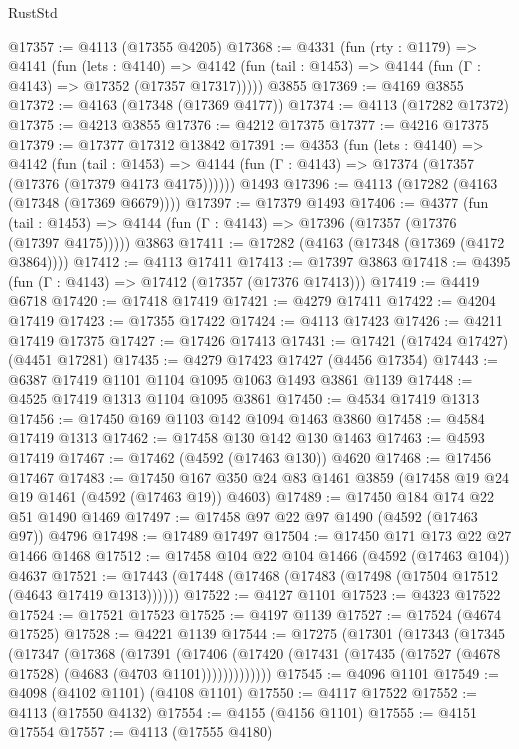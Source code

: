 \begin{lexlean}{RustStd}
\begin{coremodule}
@17357 := @4113 (@17355 @4205)
@17368 := @4331
    (fun (rty : @1179) =>
    @4141
      (fun (lets : @4140) =>
      @4142 (fun (tail : @1453) => @4144 (fun (Γ : @4143) => @17352 (@17357 @17317)))))
    @3855
@17369 := @4169 @3855
@17372 := @4163 (@17348 (@17369 @4177))
@17374 := @4113 (@17282 @17372)
@17375 := @4213 @3855
@17376 := @4212 @17375
@17377 := @4216 @17375
@17379 := @17377 @17312 @13842
@17391 := @4353
    (fun (lets : @4140) =>
    @4142
      (fun (tail : @1453) =>
      @4144 (fun (Γ : @4143) => @17374 (@17357 (@17376 (@17379 @4173 @4175))))))
    @1493
@17396 := @4113 (@17282 (@4163 (@17348 (@17369 @6679))))
@17397 := @17379 @1493
@17406 := @4377
    (fun (tail : @1453) => @4144 (fun (Γ : @4143) => @17396 (@17357 (@17376 (@17397 @4175)))))
    @3863
@17411 := @17282 (@4163 (@17348 (@17369 (@4172 @3864))))
@17412 := @4113 @17411
@17413 := @17397 @3863
@17418 := @4395 (fun (Γ : @4143) => @17412 (@17357 (@17376 @17413)))
@17419 := @4419 @6718
@17420 := @17418 @17419
@17421 := @4279 @17411
@17422 := @4204 @17419
@17423 := @17355 @17422
@17424 := @4113 @17423
@17426 := @4211 @17419 @17375
@17427 := @17426 @17413
@17431 := @17421 (@17424 @17427) (@4451 @17281)
@17435 := @4279 @17423 @17427 (@4456 @17354)
@17443 := @6387 @17419 @1101 @1104 @1095 @1063 @1493 @3861 @1139
@17448 := @4525 @17419 @1313 @1104 @1095 @3861
@17450 := @4534 @17419 @1313
@17456 := @17450 @169 @1103 @142 @1094 @1463 @3860
@17458 := @4584 @17419 @1313
@17462 := @17458 @130 @142 @130 @1463
@17463 := @4593 @17419
@17467 := @17462 (@4592 (@17463 @130)) @4620
@17468 := @17456 @17467
@17483 := @17450 @167 @350 @24 @83 @1461 @3859 (@17458 @19 @24 @19 @1461 (@4592 (@17463 @19)) @4603)
@17489 := @17450 @184 @174 @22 @51 @1490 @1469
@17497 := @17458 @97 @22 @97 @1490 (@4592 (@17463 @97)) @4796
@17498 := @17489 @17497
@17504 := @17450 @171 @173 @22 @27 @1466 @1468
@17512 := @17458 @104 @22 @104 @1466 (@4592 (@17463 @104)) @4637
@17521 := @17443 (@17448 (@17468 (@17483 (@17498 (@17504 @17512 (@4643 @17419 @1313))))))
@17522 := @4127 @1101
@17523 := @4323 @17522
@17524 := @17521 @17523
@17525 := @4197 @1139
@17527 := @17524 (@4674 @17525)
@17528 := @4221 @1139
@17544 := @17275
    (@17301
      (@17343
        (@17345
          (@17347
            (@17368
              (@17391
                (@17406
                  (@17420 (@17431 (@17435 (@17527 (@4678 @17528) (@4683 (@4703 @1101)))))))))))))
@17545 := @4096 @1101
@17549 := @4098 (@4102 @1101) (@4108 @1101)
@17550 := @4117 @17522
@17552 := @4113 (@17550 @4132)
@17554 := @4155 (@4156 @1101)
@17555 := @4151 @17554
@17557 := @4113 (@17555 @4180)

\end{coremodule}
\end{lexlean}
